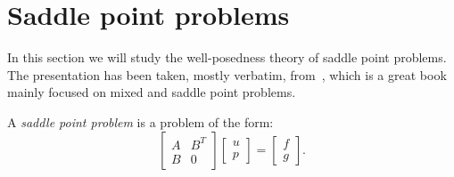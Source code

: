 \section{Saddle point problems}\label{sec:saddle-point}
In this section we will study the well-posedness theory of saddle point problems. The presentation has been taken, mostly verbatim, from~\cite{gatica2014simple}, which is a great book mainly focused on mixed and saddle point problems. 
\begin{definition}
    A \emph{saddle point problem} is a problem of the form:
    \begin{equation}
        \begin{bmatrix}
            A & B^{T}\\ 
            B & 0
        \end{bmatrix}
        \begin{bmatrix}
            u \\ p
        \end{bmatrix}
        =
        \begin{bmatrix}
            f \\ g
        \end{bmatrix}.
    \end{equation}
\end{definition}

